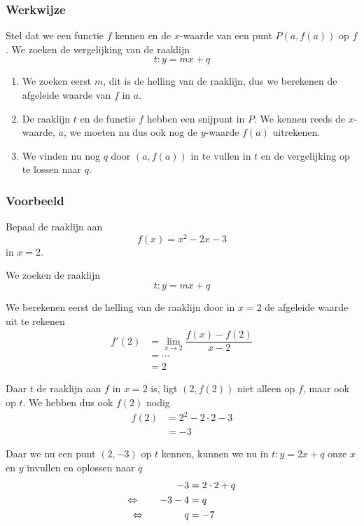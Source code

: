\documentclass[a4paper,12pt,twoside]{article}
\begin{document}
\subsubsection*{Werkwijze}
Stel dat we een functie $f$ kennen en de $x$-waarde van een punt $P(a,f(a))$ op $f$. We zoeken de vergelijking van de raaklijn
$$t: y=mx+q$$
\begin{enumerate}
\item We zoeken eerst $m$, dit is de helling van de raaklijn, dus we berekenen de afgeleide waarde van $f$ in $a$.
\item De raaklijn $t$ en de functie $f$ hebben een snijpunt in $P$. We kennen reeds de $x$-waarde, $a$, we moeten nu dus ook nog de $y$-waarde $f(a)$ uitrekenen.
\item We vinden nu nog $q$ door $(a,f(a))$ in te vullen in $t$ en de vergelijking op te lossen naar $q$.
\end{enumerate}

\subsubsection*{Voorbeeld}

Bepaal de raaklijn aan
$$f(x)=x^2-2 x-3$$
in $x=2$.

We zoeken de raaklijn
$$t : y=mx+q$$

We berekenen eerst de helling van de raaklijn door in $x=2$ de afgeleide waarde uit te rekenen
\begin{align*}
  f'(2) &= \lim_{x \to 2}\dfrac{f(x)-f(2)}{x-2}\\
        &= \cdots \\
        &= 2
\end{align*}

Daar $t$ de raaklijn aan $f$ in $x=2$ is, ligt $(2,f(2))$ niet alleen op $f$, maar ook op $t$. We hebben dus ook $f(2)$ nodig
\begin{align*}
  f(2) &= 2^2 - 2 \cdot 2 - 3\\
       &= -3
\end{align*}

Daar we nu een punt $(2,-3)$ op $t$ kennen, kunnen we nu in $t: y=2x+q$ onze $x$ en $y$ invullen en oplossen naar $q$
\begin{align*}
        -3     & = 2 \cdot 2 + q \\
  \Leftrightarrow \qquad  -3 - 4 & = q         \\
  \Leftrightarrow \qquad \qquad q      & = -7
\end{align*}
\end{document}
